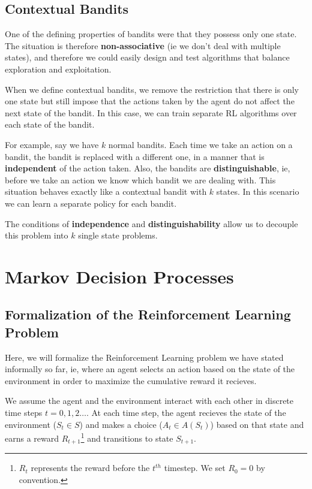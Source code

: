 \documentclass[12pt]{report}
\begin{document}
\section{Contextual Bandits}
One of the defining properties of bandits were that they possess only one state. The situation is therefore \textbf{non-associative} (ie we don't deal with multiple states), and therefore we could easily design 
and test algorithms that balance exploration and exploitation.

When we define contextual bandits, we remove the restriction that there is only one state but still impose that the actions taken by the agent do not affect the next state of the bandit. In this case, we can train separate RL algorithms 
over each state of the bandit.

For example, say we have $k$ normal bandits. Each time we take an action on a bandit, the bandit is replaced with a different one, in a manner that is \textbf{independent} of the action taken. Also, the bandits are \textbf{distinguishable}, 
ie, before we take an action we know which bandit we are dealing with. This situation behaves exactly like a contextual bandit with $k$ states. In this scenario we can learn a separate policy for each bandit.

The conditions of \textbf{independence} and \textbf{distinguishability} allow us to decouple this problem into $k$ single state problems.

\chapter{Markov Decision Processes}
\section{Formalization of the Reinforcement Learning Problem}
Here, we will formalize the Reinforcement Learning problem we have stated informally so far, ie, where an agent selects an action based on the state of the environment in order to maximize the cumulative reward it recieves.

We assume the agent and the environment interact with each other in discrete time steps $t = 0, 1, 2 \dots$. At each time step, the agent recieves the state of the environment ($S_{t} \in S$) and makes a choice ($A_{t} \in A(S_{t})$) based on that state 
and earns a reward $R_{t + 1}$\footnote{$R_{t}$ represents the reward before the $t^{th}$ timestep. We set $R_{0} = 0$ by convention.} and transitions to state $S_{t + 1}$. 
\end{document}
